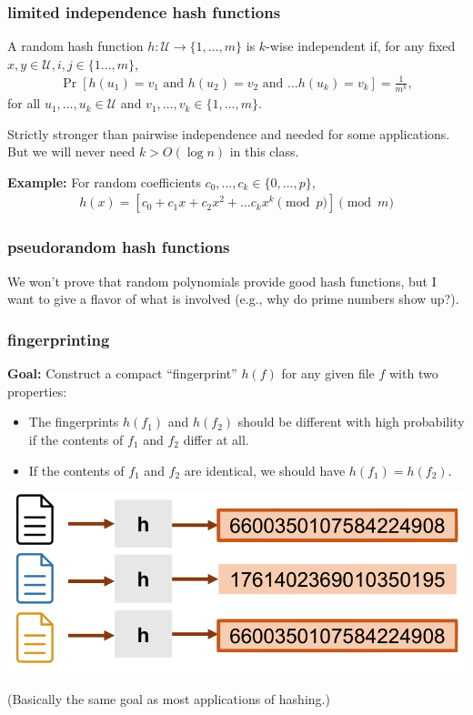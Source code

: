 \documentclass[handout,compress]{beamer}
\begin{document}
\begin{frame}[t]
	\frametitle{limited independence hash functions}
	\begin{definition}
		A random hash function $h: \mathcal{U} \rightarrow \{1, \ldots, m\}$ is $k$-wise independent if, for any fixed $x,y\in \mathcal{U}, i,j \in \{1\ldots, m\}$,
		\begin{align*}
			\Pr[h(u_1) = v_1 \text{ and } h(u_2) = v_2 \text{ and } \ldots h(u_k) = v_k] = \frac{1}{m^k}, 	
		\end{align*}
		for all $u_1, \ldots, u_k \in \mathcal{U}$ and $v_1, \ldots, v_k \in \{1, \ldots, m\}$.
	\end{definition}

Strictly stronger than pairwise independence and needed for some applications. But we will never need $k > O(\log n)$ in this class. 

\textbf{Example:} For random coefficients $c_0, \ldots, c_k \in \{0, \ldots, p\}$,
\begin{align*}
	h(x) = \left[c_0 + c_1 x + c_2 x^2 + \ldots c_k x^k \pmod{p}\right] \pmod{m}
\end{align*}
\end{frame}



\begin{frame}
	\frametitle{pseudorandom hash functions}
	We won't prove that random polynomials provide good hash functions, but I want to give a flavor of what is involved (e.g., why do prime numbers show up?).
\end{frame}

\begin{frame}
	\frametitle{fingerprinting}
	\textbf{Goal:} Construct a compact ``fingerprint'' $h(f)$ for any given file $f$ with two properties:
	\begin{itemize}
		\item The fingerprints $h(f_1)$ and $h(f_2)$ should be different with high probability if the contents of $f_1$ and $f_2$ differ at all. 
		\item If the contents of $f_1$ and $f_2$ are identical, we should have $h(f_1) = h(f_2)$.
	\end{itemize}
	\begin{center}
		\includegraphics[width=.75\textwidth]{finger_print.png}
	\end{center}
	\begin{center}
	(Basically the same goal as most applications of hashing.)
	\end{center}
\end{frame}
\end{document}
